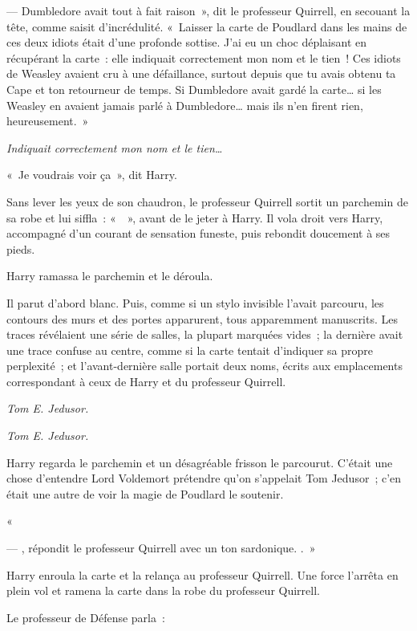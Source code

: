 --- Dumbledore avait tout à fait raison~», dit le professeur Quirrell, en secouant la tête, comme saisit d'incrédulité. «~Laisser la carte de Poudlard dans les mains de ces deux idiots était d'une profonde sottise. J'ai eu un choc déplaisant en récupérant la carte~: elle indiquait correctement mon nom et le tien~! Ces idiots de Weasley avaient cru à une défaillance, surtout depuis que tu avais obtenu ta Cape et ton retourneur de temps. Si Dumbledore avait gardé la carte… si les Weasley en avaient jamais parlé à Dumbledore… mais ils n'en firent rien, heureusement.~»

\emph{Indiquait correctement mon nom et le tien…}

«~Je voudrais voir ça~», dit Harry.

Sans lever les yeux de son chaudron, le professeur Quirrell sortit un parchemin de sa robe et lui siffla~: «~~», avant de le jeter à Harry. Il vola droit vers Harry, accompagné d'un courant de sensation funeste, puis rebondit doucement à ses pieds.

Harry ramassa le parchemin et le déroula.

Il parut d'abord blanc. Puis, comme si un stylo invisible l'avait parcouru, les contours des murs et des portes apparurent, tous apparemment manuscrits. Les traces révélaient une série de salles, la plupart marquées vides~; la dernière avait une trace confuse au centre, comme si la carte tentait d'indiquer sa propre perplexité~; et l'avant-dernière salle portait deux noms, écrits aux emplacements correspondant à ceux de Harry et du professeur Quirrell.

\emph{Tom E. Jedusor.}

\emph{Tom E. Jedusor.}

Harry regarda le parchemin et un désagréable frisson le parcourut. C'était une chose d'entendre Lord Voldemort prétendre qu'on s'appelait Tom Jedusor~; c'en était une autre de voir la magie de Poudlard le soutenir.

«~

--- , répondit le professeur Quirrell avec un ton sardonique. .~»

Harry enroula la carte et la relança au professeur Quirrell. Une force l'arrêta en plein vol et ramena la carte dans la robe du professeur Quirrell.

Le professeur de Défense parla~:

